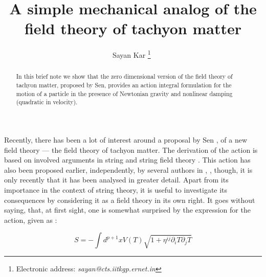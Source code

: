 \documentclass[a4paper,prd,aps,twocolumn]{revtex4}
\begin{document}
\title{A simple mechanical analog of the field theory of tachyon matter}
\author{Sayan Kar \footnote{Electronic address: {\em sayan@cts.iitkgp.ernet.in}}
${}^{}$
}
\address{Department of Physics and Centre for
Theoretical Studies \\Indian Institute of Technology, Kharagpur 721 302, India}
\begin{abstract}
In this brief note we show that the zero dimensional version of the field 
theory of tachyon matter, proposed by Sen, 
provides an action integral formulation for the 
motion of a particle in the presence of Newtonian gravity 
and nonlinear damping (quadratic in velocity).   
\end{abstract}
\maketitle


\maketitle
\vspace{.2in}

Recently, there has been a lot of interest around a proposal
by Sen {\cite{sen1}}, of a new field theory  
--- the field theory of tachyon matter. The derivation of the
action is based on involved arguments in string and
string field theory {\cite{sen1,sen2}}. This action has also been
proposed earlier, independently, by several authors in
{\cite{others}}, {\cite{panda}}, though, it is only recently 
that it has been analysed in greater detail{\cite{sen1,sen2}}.
Apart from its importance in the context of string theory,
it is useful to
investigate its consequences by considering it 
as a field theory in its own right. 
It goes without saying, that, at first sight, one
is somewhat surprised by the expression for the action, given as :

\begin{equation}
S = -\int d^{p+1}x V(T)\sqrt{1+\eta^{ij}\partial_i T\partial_j T}
\end{equation}
\end{document}
